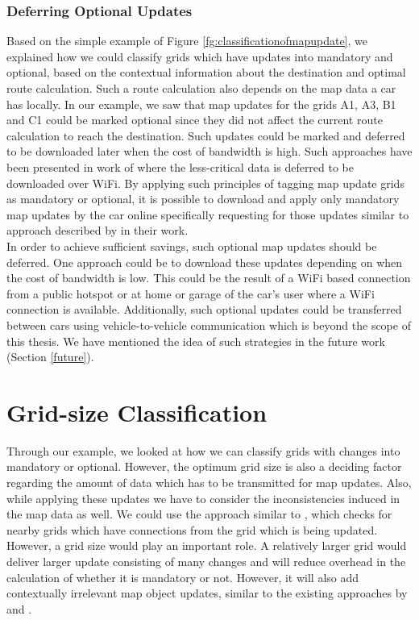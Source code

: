 \subsubsection{Deferring Optional Updates}
Based on the simple example of Figure \ref{fg:classificationofmapupdate}, we explained how we could classify grids which have updates into mandatory and optional, based on the contextual information about the destination and optimal route calculation. Such a route calculation also depends on the map data a car has locally. In our example, we saw that map updates for the grids A1, A3, B1 and C1 could be marked optional since they did not affect the current route calculation to reach the destination. Such updates could be marked and deferred to be downloaded later when the cost of bandwidth is high. Such approaches have been presented in work of \citet{balasubramanian2010augmenting} where the less-critical data is deferred to be downloaded over WiFi. By applying such principles of tagging map update grids as mandatory or optional, it is possible to download and apply only mandatory map updates by the car online specifically requesting for those updates similar to approach described by \citet{min2011system} in their work. \\

In order to achieve sufficient savings, such optional map updates should be deferred. One approach could be to download these updates depending on when the cost of bandwidth is low. This could be the result of a WiFi based connection from a public hotspot or at home or garage of the car's user where a WiFi connection is available. Additionally, such optional updates could be transferred between cars using vehicle-to-vehicle communication which is beyond the scope of this thesis. We have mentioned the idea of such strategies in the future work (Section \ref{future}).
\section{Grid-size Classification} \label{gridsizeclassification}
Through our example, we looked at how we can classify grids with changes into mandatory or optional. However, the optimum grid size is also a deciding factor regarding the amount of data which has to be transmitted for map updates. Also, while applying these updates we have to consider the inconsistencies induced in the map data as well. We could use the approach similar to \citet{asahara2008locally}, which checks for nearby grids which have connections from the grid which is being updated. However, a grid size would play an important role. A relatively larger grid would deliver larger update consisting of many changes and will reduce overhead in the calculation of whether it is mandatory or not. However, it will also add contextually irrelevant map object updates, similar to the existing approaches by \cite{min2011system} and \cite{bastiaensen2003actmap}. \\

